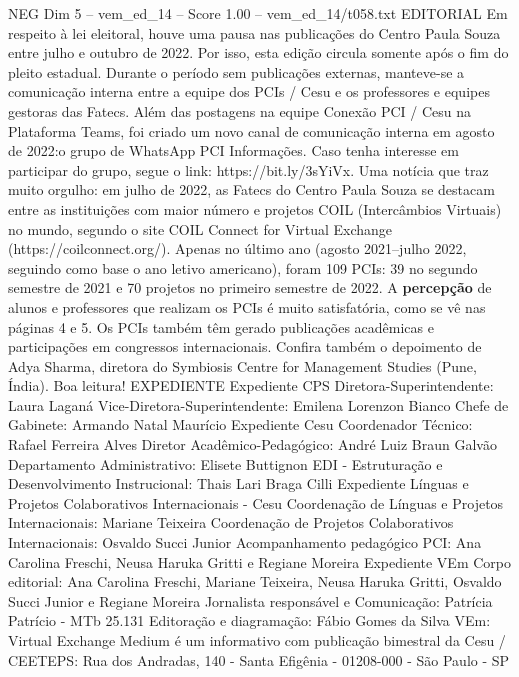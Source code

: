 \begin{textsample}{NEG Dim 5 – vem\_ed\_14 – Score 1.00 – vem\_ed\_14/t058.txt}  \label{ex:f5_neg_013}
EDITORIAL Em respeito à lei eleitoral, houve uma pausa nas publicações do Centro Paula Souza entre julho e outubro de 2022.
Por isso, esta edição circula somente após o fim do pleito estadual.
Durante o período sem publicações externas, manteve-se a comunicação interna entre a equipe dos PCIs / Cesu e os professores e equipes gestoras das Fatecs.
Além das postagens na equipe Conexão PCI / Cesu na Plataforma Teams, foi criado um novo canal de comunicação interna em agosto de 2022:o grupo de WhatsApp PCI Informações.
Caso tenha interesse em participar do grupo, segue o link: https://bit.ly/3sYiVx.
Uma notícia que traz muito orgulho: em julho de 2022, as Fatecs do Centro Paula Souza se destacam entre as instituições com maior número e projetos COIL (Intercâmbios Virtuais) no mundo, segundo o site COIL Connect for Virtual Exchange (https://coilconnect.org/).
Apenas no último ano (agosto 2021–julho 2022, seguindo como base o ano letivo americano), foram 109 PCIs: 39 no segundo semestre de 2021 e 70 projetos no primeiro semestre de 2022.
A \textbf{percepção} de alunos e professores que realizam os PCIs é muito satisfatória, como se vê nas páginas 4 e 5.
Os PCIs também têm gerado publicações acadêmicas e participações em congressos internacionais.
Confira também o depoimento de Adya Sharma, diretora do Symbiosis Centre for Management Studies (Pune, Índia).
Boa leitura!
EXPEDIENTE Expediente CPS Diretora-Superintendente: Laura Laganá Vice-Diretora-Superintendente: Emilena Lorenzon Bianco Chefe de Gabinete: Armando Natal Maurício Expediente Cesu Coordenador Técnico: Rafael Ferreira Alves Diretor Acadêmico-Pedagógico: André Luiz Braun Galvão Departamento Administrativo: Elisete Buttignon EDI - Estruturação e Desenvolvimento Instrucional: Thais Lari Braga Cilli Expediente Línguas e Projetos Colaborativos Internacionais - Cesu Coordenação de Línguas e Projetos Internacionais: Mariane Teixeira Coordenação de Projetos Colaborativos Internacionais: Osvaldo Succi Junior Acompanhamento pedagógico PCI: Ana Carolina Freschi, Neusa Haruka Gritti e Regiane Moreira Expediente VEm Corpo editorial: Ana Carolina Freschi, Mariane Teixeira, Neusa Haruka Gritti, Osvaldo Succi Junior e Regiane Moreira Jornalista responsável e Comunicação: Patrícia Patrício - MTb 25.131 Editoração e diagramação: Fábio Gomes da Silva VEm: Virtual Exchange Medium é um informativo com publicação bimestral da Cesu / CEETEPS: Rua dos Andradas, 140 - Santa Efigênia - 01208-000 - São Paulo - SP

\end{textsample}
